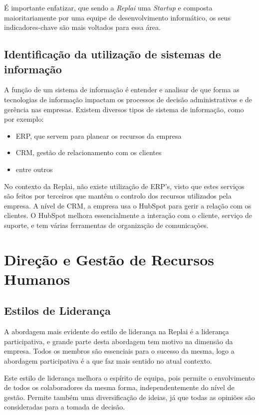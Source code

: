 É importante enfatizar, que sendo a \textit{Replai} uma \textit{Startup} e composta maioritariamente por uma equipe de desenvolvimento informático, os seus indicadores-chave são mais voltados para essa área. 


\subsection{Identificação da utilização de sistemas de informação}
A função de um  sistema de informação é entender e analisar de que forma as tecnologias de informação impactam os processos de decisão administrativos e de gerência nas empresas. 
Existem diversos tipos de sistema de informação, como por exemplo: \begin{itemize}
    \item ERP, que servem para planear os recursos da empresa
    \item CRM, gestão de relacionamento com os clientes
    \item entre outros
\end{itemize} 
No contexto da Replai, não existe utilização de ERP's, visto que estes serviços são feitos por terceiros que mantêm o controlo dos recursos utilizados pela empresa.
A nível de CRM, a empresa usa o HubSpot para gerir a relação com os clientes. O HubSpot melhora essencialmente a interação  com o cliente, serviço de suporte, e tem várias ferramentas de organização de comunicações. 

\newpage
\section{Direção e Gestão de Recursos Humanos}

\subsection{Estilos de Liderança}

A abordagem mais evidente do estilo de liderança na Replai é a liderança participativa, e grande parte desta abordagem tem motivo na dimensão da empresa. Todos os membros são essenciais para o sucesso da mesma, logo a abordagem participativa é a que faz mais sentido no atual contexto. 


Este estilo de liderança melhora o espírito de equipa, pois permite o envolvimento de todos os colaboradores da mesma forma, independentemente do nível de gestão. Permite também uma diversificação de ideias, já que todas as opiniões são consideradas para a tomada de decisão. 


